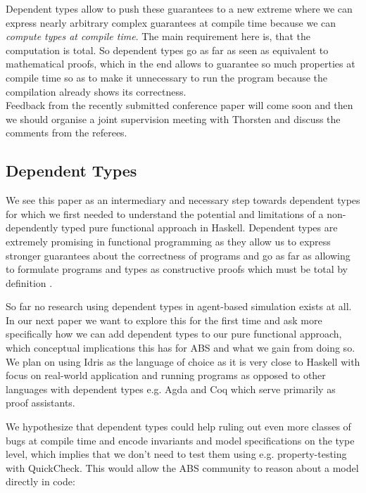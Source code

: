 Dependent types allow to push these guarantees to a new extreme where we can express nearly arbitrary complex guarantees at compile time because we can \textit{compute types at compile time}. The main requirement here is, that the computation is total. So dependent types go as far as seen as equivalent to mathematical proofs, which in the end allows to guarantee so much properties at compile time so as to make it unnecessary to run the program because the compilation already shows its correctness.
\\

Feedback from the recently submitted conference paper will come soon and then we should organise a joint supervision meeting with Thorsten and discuss the comments from the referees.

\subsection{Dependent Types}
We see this paper as an intermediary and necessary step towards dependent types for which we first needed to understand the potential and limitations of a non-dependently typed pure functional approach in Haskell. Dependent types are extremely promising in functional programming as they allow us to express stronger guarantees about the correctness of programs and go as far as allowing to formulate programs and types as constructive proofs which must be total by definition \cite{thompson_type_1991, mckinna_why_2006, altenkirch_pi_2010}.

So far no research using dependent types in agent-based simulation exists at all. In our next paper we want to explore this for the first time and ask more specifically how we can add dependent types to our pure functional approach, which conceptual implications this has for ABS and what we gain from doing so. We plan on using Idris \cite{brady_idris_2013} as the language of choice as it is very close to Haskell with focus on real-world application and running programs as opposed to other languages with dependent types e.g. Agda and Coq which serve primarily as proof assistants.

We hypothesize that dependent types could help ruling out even more classes of bugs at compile time and encode invariants and model specifications on the type level, which implies that we don't need to test them using e.g. property-testing with QuickCheck. This would allow the ABS community to reason about a model directly in code:

